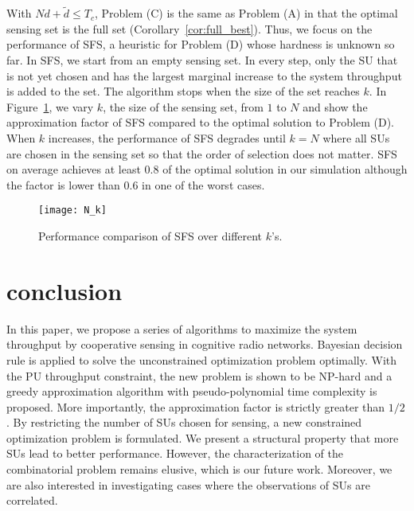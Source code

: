 \documentclass[conference]{IEEEtran}
\begin{document}
With $Nd+\tilde{d}\le T_c$, Problem (C) is the same as Problem (A) in that the optimal sensing set is the full set (Corollary~\ref{cor:full_best}). Thus, we focus on the performance of SFS, a heuristic for Problem (D) whose hardness is unknown so far. In SFS, we start from an empty sensing set. In every step, only the SU that is not yet chosen and has the largest marginal increase to the system throughput is added to the set. The algorithm stops when the size of the set reaches $k$. In Figure~\ref{fig:N_k}, we vary $k$, the size of the sensing set, from $1$ to $N$ and show the approximation factor of SFS compared to the optimal solution to Problem (D). When $k$ increases, the performance of SFS degrades until $k=N$ where all SUs are chosen in the sensing set so that the order of selection does not matter. SFS on average achieves at least $0.8$ of the optimal solution in our simulation although the factor is lower than $0.6$ in one of the worst cases.   

\begin{figure}[tb]
    \begin{center}
    \setlength{\unitlength}{1in}
    \texttt{[image: N\_k]}
    \end{center}
\vspace{-1.5em}
\caption{Performance comparison of SFS over different $k$'s.}
\vspace{-2em}
\label{fig:N_k}
\end{figure}

\section{conclusion}
\label{sec:con}
In this paper, we propose a series of algorithms to maximize the system throughput by cooperative sensing in cognitive radio networks. Bayesian decision rule is applied to solve the unconstrained optimization problem optimally. With the PU throughput constraint, the new problem is shown to be NP-hard and a greedy approximation algorithm with pseudo-polynomial time complexity is proposed. More importantly, the approximation factor is strictly greater than $1/2$. By restricting the number of SUs chosen for sensing, a new constrained optimization problem is formulated. We present a structural property that more SUs lead to better performance. However, the characterization of the combinatorial problem remains elusive, which is our future work. Moreover, we are also interested in investigating cases where the observations of SUs are correlated.  

\begin{spacing}{0.9}

\small

\end{spacing}
\end{document}
